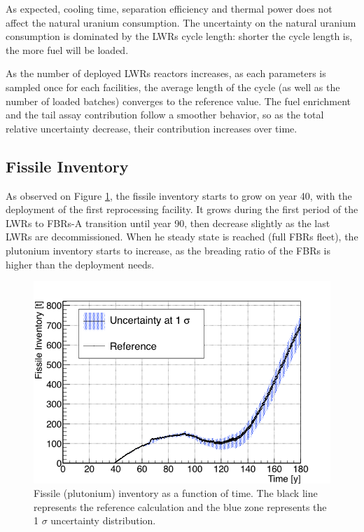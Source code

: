 \documentclass{anstrans}
\begin{document}
As expected, cooling time, separation efficiency and thermal power does not
affect the natural uranium consumption.  The uncertainty on the natural uranium
consumption is dominated by the \glspl{LWR} cycle length: shorter the cycle
length is, the more fuel will be loaded.

As the number of deployed \glspl{LWR} reactors increases, as each parameters is
sampled once for each facilities, the average length of the cycle (as well as
the number of loaded batches) converges to the reference value.
The fuel enrichment and the tail assay contribution follow a smoother behavior,
so as the total relative uncertainty decrease, their contribution increases over
time.

\subsection{Fissile Inventory}
As observed on Figure \ref{fig:pu_full}, the fissile inventory starts to grow on
year 40, with the deployment of the first reprocessing facility. It grows
during the first period of the \glspl{LWR} to \glspl{FBR}-A transition until
year 90, then decrease slightly as the last \glspl{LWR} are decommissioned.
When he steady state is reached (full \glspl{FBR} fleet), the plutonium
inventory starts to increase, as the breading ratio of the \glspl{FBR} is higher
than the deployment needs.

\begin{figure}[ht] %
    \centering
    \includegraphics[scale=0.35]{pu_full}
    \caption{Fissile (plutonium) inventory as a function of time. The black line
        represents the reference calculation and the blue zone
        represents the 1 $\sigma$ uncertainty distribution.}\label{fig:pu_full}
\end{figure}
\end{document}
